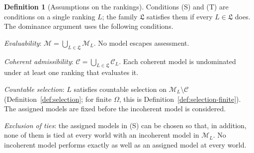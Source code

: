 \documentclass[11pt]{article}
\theoremstyle{definition}
\newtheorem{definition}[theorem]{Definition}
\theoremstyle{remark}
\newcommand{\M}{\mathcal M}
\newcommand{\C}{\mathcal C}
\newcommand{\Lf}{\mathfrak L}
\begin{document}
\begin{definition}[Assumptions on the rankings]\label{def:argument-assumptions}
{\color{red}Conditions (S) and (T)} are conditions on a single ranking $L$; the family $\Lf$ satisfies them if every $L\in\Lf$ does. The dominance argument uses the following conditions.
\begin{itemize}[leftmargin=3.4em,labelsep=0.5em]
\item[\textbf{(E)}] \emph{Evaluability}: $\M=\bigcup_{L\in\Lf}\M_L$. No model escapes assessment.
\item[\textbf{(A)}] \emph{Coherent admissibility}: $\C=\bigcup_{L\in\Lf}\C_L$. Each coherent model is undominated under at least one ranking that evaluates it.
\item[\textbf{{\color{red}(S)}}] \emph{Countable selection}: $L$ satisfies countable selection on $\M_L\setminus\C$ (Definition~\ref{def:selection}{\color{red}; for finite $\Omega$, this is Definition~\ref{def:selection-finite}}). {\color{red}The assigned models} are fixed before the incoherent model is considered.
{\color{red}\item[\textbf{(T)}] \emph{Exclusion of ties}: the assigned models in (S) can be chosen so that, in addition, none of them is tied at every world with an incoherent model in $\M_L$. No incoherent model performs exactly as well as an assigned model at every world.}
\end{itemize}
\end{definition}
\end{document}
